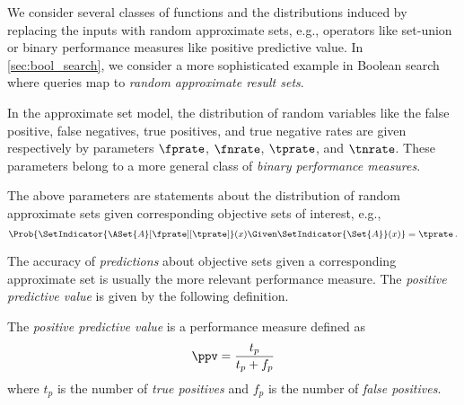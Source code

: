 \documentclass[ ../main.tex]{subfiles}
\begin{document}
We consider several classes of functions and the distributions induced by replacing the inputs with random approximate sets, e.g., operators like set-union or binary performance measures like positive predictive value.
In \cref{sec:bool_search}, we consider a more sophisticated example in Boolean search where queries map to \emph{random approximate result sets}.


In the approximate set model, the distribution of random variables like the false positive, false negatives, true positives, and true negative rates are given respectively by parameters $\fprate$, $\fnrate$, $\tprate$, and $\tnrate$.
These parameters belong to a more general class of \emph{binary performance measures}.

The above parameters are statements about the distribution of random approximate sets given corresponding objective sets of interest, e.g.,
\begin{equation}
\Prob{\SetIndicator{\ASet{A}[\fprate][\tprate]}(x) \Given 
	\SetIndicator{\Set{A}}(x)} = \tprate\,.
\end{equation}

The accuracy of \emph{predictions} about objective sets given a corresponding approximate set is usually the more relevant performance measure.
The \emph{positive predictive value} is given by the following definition.
\begin{definition}
	The \emph{positive predictive value} is a performance measure defined as 
	\begin{equation}
	\ppv = \frac{t_p}{t_p + f_p}
	\end{equation}
	where $t_p$ is the number of \emph{true positives} and $f_p$ is the number 
	of \emph{false positives}.
\end{definition}
\end{document}
